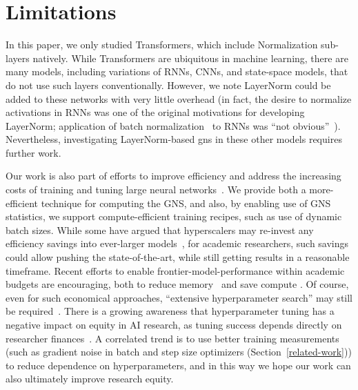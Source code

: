\section{Limitations}\label{limitations}

In this paper, we only studied Transformers, which include Normalization
sub-layers natively.  While Transformers are ubiquitous in machine
learning, there are many models, including variations of RNNs, CNNs,
and state-space models, that do not use such layers conventionally.
However, we note LayerNorm could be added to these networks with very
little overhead (in fact, the desire to normalize activations in RNNs
was one of the original motivations for developing LayerNorm;
application of batch normalization~\cite{ioffe2015batch} to RNNs was
``not obvious''~\cite{ba2016layer}).
Nevertheless, investigating LayerNorm-based \ac{gns} in these other
models requires further work.


Our work is also part of efforts to improve efficiency and address the
increasing costs of training and tuning large neural
networks~\cite{bender2021dangers}.
We provide both a more-efficient technique for computing the GNS, and
also, by enabling use of GNS statistics, we support compute-efficient
training recipes, such as use of dynamic batch sizes.
While some have argued that hyperscalers may re-invest any efficiency
savings into ever-larger models~\cite{patterson2021carbon}, for
academic researchers, such savings could allow pushing the
state-of-the-art, while still getting results in a reasonable
timeframe.
Recent efforts to enable frontier-model-performance within academic
budgets are encouraging, both to reduce
memory~\cite{malladi2023fine,dettmers2023qlora} and save compute
\cite{li2023clipa,anagnostidis2023navigating}.
Of course, even for such economical approaches, ``extensive
hyperparameter search'' may still be required~\cite{izsak2021train}.
There is a growing awareness that hyperparameter tuning has a negative
impact on equity in AI research, as tuning success depends directly on
researcher finances~\cite{strubell2019energy}.
A correlated trend is to use better training measurements (such as
gradient noise in batch and step size optimizers
(Section~\ref{related-work})) to reduce dependence on hyperparameters,
and in this way we hope our work can also ultimately improve research
equity.
